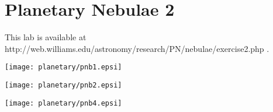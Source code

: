 \chapter{Planetary Nebulae 2}

This lab is available at http://web.williams.edu/astronomy/research/PN/nebulae/exercise2.php .

\texttt{[image: planetary/pnb1.epsi]}

\texttt{[image: planetary/pnb2.epsi]}

\texttt{[image: planetary/pnb4.epsi]}


